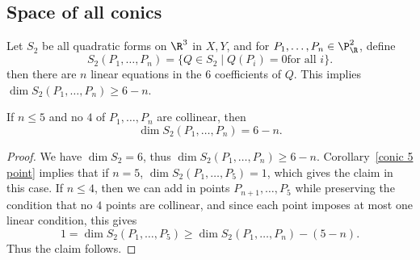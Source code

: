 \subsection{Space of all conics}
Let $S_2$ be all quadratic forms on $\R^3$ in $X,Y$, and for $P_1,\dots,P_n\in\P^2_\R$, define
\[S_2(P_1,\dots,P_n)=\{Q\in S_2\mid Q(P_i)=0\text{for all $i$}\}.\]
then there are $n$ linear equations in the $6$ coefficients of $Q$. This implies $\dim S_2(P_1,\dots,P_n)\geq 6-n$.
\begin{proposition}\label{conic dim}
If $n\leq 5$ and no $4$ of $P_1,\dots,P_n$ are collinear, then
\[\dim S_2(P_1,\dots,P_n)=6-n.\]
\end{proposition}
\begin{proof}
We have $\dim S_2=6$, thus $\dim S_2(P_1,\dots,P_n)\geq 6-n$. Corollary~\ref{conic 5 point} implies that if $n=5$, $\dim S_2(P_1,\dots,P_5)=1$, which gives the claim in this case. If $n\leq4$, then we can add in points $P_{n+1},\dots,P_5$ while preserving the condition that no $4$ points are collinear, and since each point imposes at most one linear condition, this gives
\[1=\dim S_2(P_1,\dots,P_5)\geq \dim S_2(P_1,\dots,P_n)-(5-n).\]
Thus the claim follows.
\end{proof}
